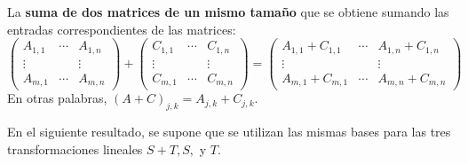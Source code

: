 \setcounter{mydef}{34}
\begin{mydef}\;\\\\
    La \textbf{suma de dos matrices de un mismo tamaño} que se obtiene sumando las entradas correspondientes de las matrices:
    $$
    \begin{pmatrix}
	A_{1,1}&\cdots&A_{1,n}\\
	\vdots&&\vdots\\
	A_{m,1}&\cdots&A_{m,n}
    \end{pmatrix}
    +
    \begin{pmatrix}
	C_{1,1}&\cdots&C_{1,n}\\
	\vdots&&\vdots\\
	C_{m,1}&\cdots&C_{m,n}
    \end{pmatrix}
    =
    \begin{pmatrix}
	A_{1,1}+C_{1,1}&\cdots&A_{1,n}+C_{1,n}\\
	\vdots&&\vdots\\
	A_{m,1}+C_{m,1}&\cdots&A_{m,n}+C_{m,n}
    \end{pmatrix}
    $$
    En otras palabras, $(A+C)_{j,k}=A_{j,k}+C_{j,k}$.
\end{mydef}

En el siguiente resultado, se supone que se utilizan las mismas bases para las tres transformaciones lineales $S + T, S ,$ y $T$.

